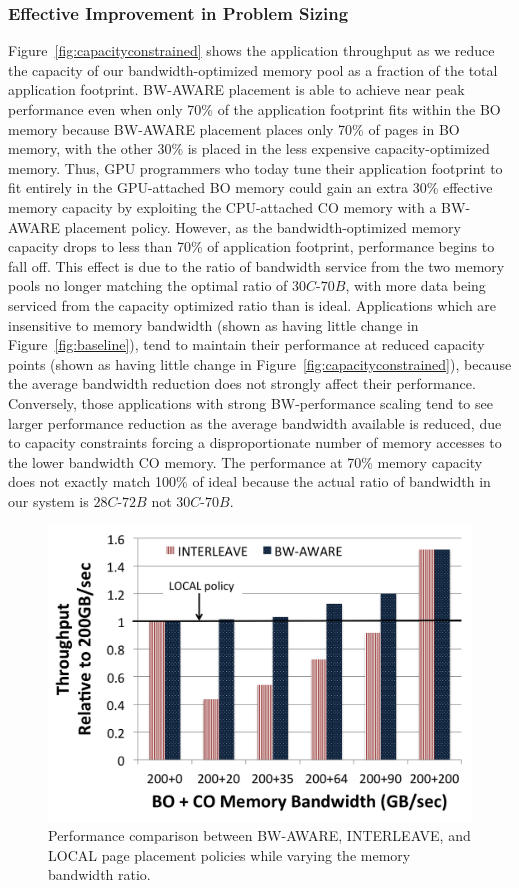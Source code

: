 \subsubsection{Effective Improvement in Problem Sizing}
Figure~\ref{fig:capacityconstrained} shows the application throughput as we
reduce the capacity of our bandwidth-optimized memory pool as a fraction of the
total application footprint.  BW-AWARE placement is able to achieve near peak
performance even when only 70\% of the application footprint fits within the BO
memory because BW-AWARE placement places only 70\% of pages in BO memory, with
the other 30\% is placed in the less expensive capacity-optimized memory.  Thus,
GPU programmers who today tune their application footprint to fit entirely in
the GPU-attached BO memory could gain an extra 30\% effective memory capacity by
exploiting the CPU-attached CO memory with a BW-AWARE placement policy.
However, as the bandwidth-optimized memory capacity drops to less than 70\% of
application footprint, performance begins to fall off. This effect is due to the
ratio of bandwidth service from the two memory pools no longer matching the
optimal ratio of $30C$-$70B$, with more data being serviced from the capacity
optimized ratio than is ideal. Applications which are insensitive to memory
bandwidth (shown as having little change in Figure~\ref{fig:baseline}), tend to
maintain their performance at reduced capacity points (shown as having little
change in Figure~\ref{fig:capacityconstrained}), because the average bandwidth
reduction does not strongly affect their performance.  Conversely, those
applications with strong BW-performance scaling tend to see larger performance
reduction as the average bandwidth available is reduced, due to capacity
constraints forcing a disproportionate number of memory accesses to the lower
bandwidth CO memory.  The performance at 70\% memory capacity does not exactly
match 100\% of ideal because the actual ratio of bandwidth in our system is
$28C$-$72B$ not $30C$-$70B$.

\begin{figure}[t]
    \centering
    \includegraphics[width=0.9\columnwidth]{asplos2015/figures/sensitivitytobwratio.png}
    \caption{Performance comparison between BW-AWARE, INTERLEAVE, and LOCAL page placement
policies while varying the memory bandwidth ratio.}
    \label{fig:sensitivitytobwratio}
\end{figure}

